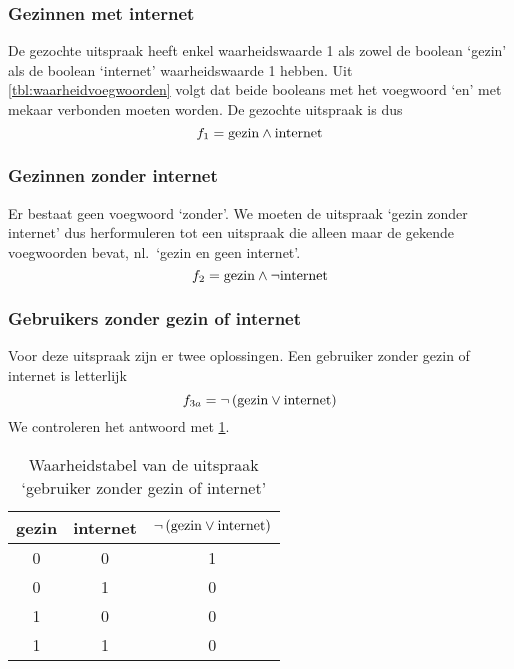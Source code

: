 \subsubsection{Gezinnen met internet}
De gezochte uitspraak heeft enkel waarheidswaarde 1 als zowel de boolean `gezin' als de boolean `internet' waarheidswaarde 1 hebben. Uit \cref{tbl:waarheidvoegwoorden} volgt dat beide booleans met het voegwoord `en' met mekaar verbonden moeten worden. De gezochte uitspraak is dus
\[
f_1=\mathrm{gezin}\wedge\mathrm{internet}
\]

\subsubsection{Gezinnen zonder internet}
Er bestaat geen voegwoord `zonder'. We moeten de uitspraak `gezin zonder internet' dus herformuleren tot een uitspraak die alleen maar de gekende voegwoorden bevat, nl.\ `gezin en geen internet'. 
\[
f_2=\mathrm{gezin}\wedge\neg \mathrm{internet}
\]

\subsubsection{Gebruikers zonder gezin of internet}
Voor deze uitspraak zijn er twee oplossingen. Een gebruiker zonder gezin of internet is letterlijk
\[
f_{3a}=\neg\left(\mathrm{gezin}\vee\mathrm{internet}\right)
\]
We controleren het antwoord met \cref{tbl:gzi}. 
\begin{table}
\caption{Waarheidstabel van de uitspraak `gebruiker zonder gezin of internet'}
\label{tbl:gzi}
\centering
\begin{tabular}{ccc}
\toprule
gezin&internet&$\neg\left(\mathrm{gezin}\vee\mathrm{internet}\right)$\\
\midrule
0&0&1\\
0&1&0\\
1&0&0\\
1&1&0\\
\bottomrule
\end{tabular}
\end{table}

